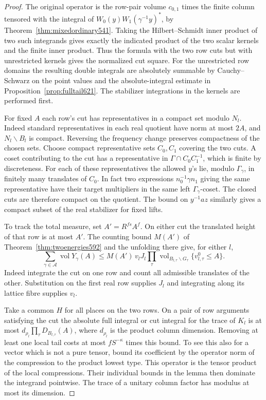 \documentclass[a4paper,11pt]{article}
\theoremstyle{definition}
\theoremstyle{remark}
\numberwithin{equation}{section}
\begin{document}
\begin{proof}
The original operator is the row-pair volume \(c_{0,1}\) times
the finite column tensored with the integral of
\(W_0(y)W_1(\gamma^{-1}y)^*\), by
Theorem~\ref{thm:mixedordinary541}. Taking the Hilbert--Schmidt
inner product of two such integrands gives exactly the indicated
product of the two scalar kernels and the finite inner product.
Thus the formula with the two row cuts but with unrestricted
kernels gives the normalized cut square. For the unrestricted
row domains the resulting double integrals are absolutely
summable by Cauchy--Schwarz on the point values and the
absolute-integral estimate in Proposition~\ref{prop:fulltail621}.
The stabilizer integrations in the kernels are performed first.

For fixed \(A\) each row's cut has representatives in a compact
set modulo \(N_l\). Indeed standard representatives in each
real quotient have norm at most \(2A\), and
\(N_l\backslash B_l\) is compact. Reversing the frequency
change preserves compactness of the chosen sets. Choose compact
representative sets \(C_0,C_1\) covering the two cuts. A coset
contributing to the cut has a representative in
\(\Gamma\cap C_0 C_1^{-1}\), which is finite by discreteness.
For each of these representatives the allowed \(y\)'s lie,
modulo \(\Gamma_\gamma\), in finitely many translates of \(C_0\).
In fact two expressions \(n_0^{-1}\gamma n_1\) giving the
same representative have their target multipliers in the
same left \(\Gamma_\gamma\)-coset. The closed cuts are therefore
compact on the quotient. The bound on \(y^{-1}az\) similarly
gives a compact subset of the real stabilizer for fixed lifts.

To track the total measure, set \(A'=R^{fs}A^f\).
On either cut the translated height of that row is at most
\(A'\). The counting bound \(M(A')\) of
Theorem~\ref{thm:twoenergies592} and the unfolding there give,
for either \(l\),
\[
 \sum_{\gamma\in\mathcal A}\operatorname{vol}Y_\gamma(A)
 \le M(A')\,v_l J_l\prod_\tau
           \operatorname{vol}_{B_{l,\tau}\backslash G_\tau}
                         \{v^0_{l,\tau}\le A\}.
\]
Indeed integrate the cut on one row and count all admissible
translates of the other. Substitution on the first real row
supplies \(J_l\) and integrating along its lattice fibre
supplies \(v_l\).

Take a common \(H\) for all places on the two rows. On a pair
of row arguments satisfying the cut the absolute full integral
or cut integral for the trace of \(K_l\) is at most
\(d_{\rho_l}\prod_\tau D_{B_{l,\tau}}(A)\), where
\(d_{\rho_l}\) is the product column dimension. Removing at
least one local tail costs at most \(f S^{-\kappa}\) times
this bound. To see this also for a vector which is not a pure
tensor, bound its coefficient by the operator norm of the
compression to the product lowest type. This operator is the
tensor product of the local compressions. Their individual
bounds in the lemma then dominate the integrand pointwise.
The trace of a unitary column factor has modulus at most its
dimension.


\end{proof}
\end{document}
